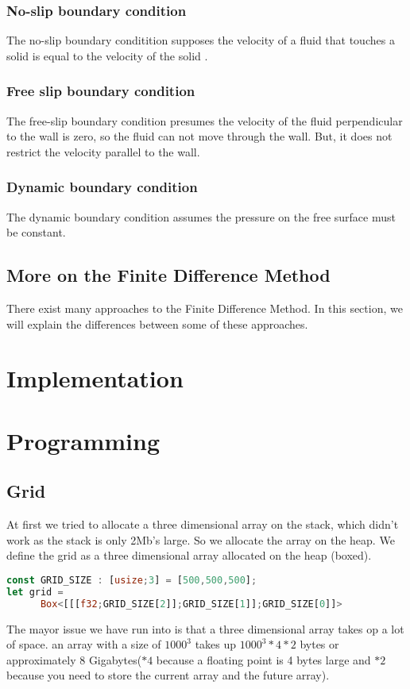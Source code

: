 \documentclass{article}
\begin{document}
\subsubsection{No-slip boundary condition}
The no-slip boundary conditition supposes the velocity of a fluid that touches a solid is equal to the velocity of the solid \cite{no-slip boundary condition}.

\subsubsection{Free slip boundary condition}
The free-slip boundary condition presumes the velocity of the fluid perpendicular to the wall is zero, so the fluid can not move through the wall. But, it does not restrict the velocity parallel to the wall.\cite{free slip boundary condition} 

\subsubsection{Dynamic boundary condition}
The dynamic boundary condition assumes the pressure on the free surface must be constant.

\subsection{More on the Finite Difference Method}
There exist many approaches to the Finite Difference Method\cite{More_FDM}. In this section, we will explain the differences between some of these approaches.




\newpage
\section{Implementation}






\section{Programming}
\subsection{Grid}
At first we tried to allocate a three dimensional array on the stack, which didn't work as the stack is only 2Mb's large. So we allocate the array on the heap. We define the grid as a three dimensional array allocated on the heap (boxed).
\begin{lstlisting}[language=Rust, style=boxed]
const GRID_SIZE : [usize;3] = [500,500,500];
let grid = 
      Box<[[[f32;GRID_SIZE[2]];GRID_SIZE[1]];GRID_SIZE[0]]>
\end{lstlisting}
The mayor issue we have run into is that a three dimensional array takes op a lot of space. an array with a size of $1000^{3}$ takes up $1000^{3}*4*2$ bytes or approximately 8 Gigabytes($*4$ because a floating point is 4 bytes large and $*2$ because you need to store the current array and the future array).
\end{document}
